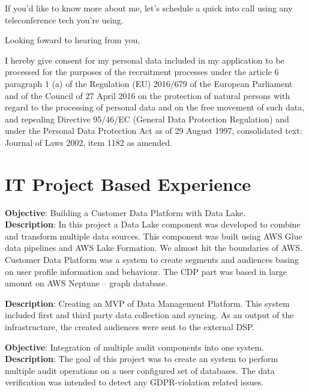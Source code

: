 \documentclass[11pt,a4paper,sans]{moderncv} %
\begin{document}
If you'd like to know more about me, let's schedule a quick into call using any teleconference tech you're using.

Looking foward to hearing from you,

\makeletterclosing %
I hereby give consent for my personal data included in my application to be processed for the purposes of the recruitment processes under the article 6 paragraph 1 (a) of the Regulation (EU) 2016/679 of the European Parliament and of the Council of 27 April 2016 on the protection of natural persons with regard to the processing of personal data and on the free movement of such data, and repealing Directive 95/46/EC (General Data Protection Regulation) and under the Personal Data Protection Act as of 29 August 1997, consolidated text: Journal of Laws 2002, item 1182 as amended.

\clearpage
\makecvtitle

\section{IT Project Based Experience}
{\textbf{Objective}: Building a Customer Data Platform with Data Lake.\\
\textbf{Description}: In this project a Data Lake component was developed to combine and transform multiple data sources.
This component was built using AWS Glue data pipelines and AWS Lake Formation. We almost hit the boundaries of AWS.
Customer Data Platform was a system to create segments and audiences basing on user profile information and behaviour. The CDP part was based in large amount on AWS Neptune -- graph database.
}

{\textbf{Description}: Creating an MVP of Data Management Platform. This system included first and third party data collection and syncing. As an output of the infrastructure, the created audiences were sent to the external DSP.
}

{\textbf{Objective}: Integration of multiple audit components into one system.\\
\textbf{Description}: The goal of this project was to create an system to perform multiple audit operations on a user configured set of databases. The data verification was intended to detect any GDPR-violation related issues.
}
\end{document}
